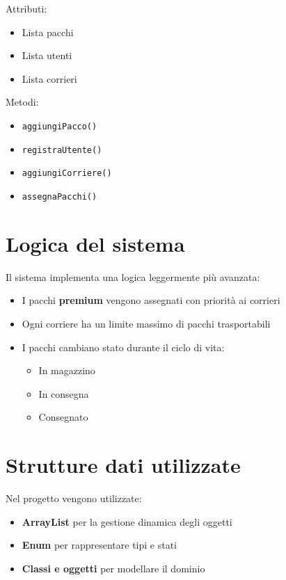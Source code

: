 \documentclass[a4paper,12pt]{article}
\begin{document}
Attributi:
\begin{itemize}
    \item Lista pacchi
    \item Lista utenti
    \item Lista corrieri
\end{itemize}

Metodi:
\begin{itemize}
    \item \texttt{aggiungiPacco()}
    \item \texttt{registraUtente()}
    \item \texttt{aggiungiCorriere()}
    \item \texttt{assegnaPacchi()}
\end{itemize}

\section{Logica del sistema}

Il sistema implementa una logica leggermente più avanzata:

\begin{itemize}
    \item I pacchi \textbf{premium} vengono assegnati con priorità ai corrieri
    \item Ogni corriere ha un limite massimo di pacchi trasportabili
    \item I pacchi cambiano stato durante il ciclo di vita:
    \begin{itemize}
        \item In magazzino
        \item In consegna
        \item Consegnato
    \end{itemize}
\end{itemize}

\section{Strutture dati utilizzate}
Nel progetto vengono utilizzate:
\begin{itemize}
    \item \textbf{ArrayList} per la gestione dinamica degli oggetti
    \item \textbf{Enum} per rappresentare tipi e stati
    \item \textbf{Classi e oggetti} per modellare il dominio
\end{itemize}
\end{document}
